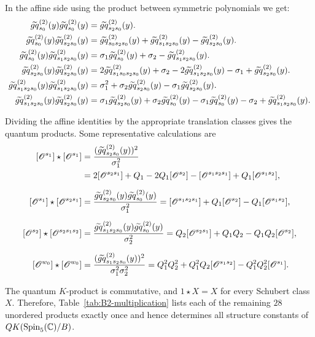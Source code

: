 \documentclass[a4paper]{amsart}
\theoremstyle{remark}
\numberwithin{equation}{section}
\begin{document}
In the affine side using the product between symmetric polynomials we get:
\begin{align*}
\tgq{s_0}{2}(y)\tgq{s_0}{2}(y)&=\tgq{s_2s_0}{2}(y).\\
\tgq{s_0}{2}(y)\tgq{s_2s_0}{2}(y)&=\tgq{s_0s_2s_0}{2}(y)+\tgq{s_1s_2s_0}{2}(y)-\tgq{s_2s_0}{2}(y).\label{eq_P3}\\
\tgq{s_0}{2}(y)\tgq{s_1s_2s_0}{2}(y)&=\sigma_1\tgq{s_0}{2}(y) +\sigma_2- \tgq{s_1s_2s_0}{2}(y).\\
\tgq{s_2s_0}{2}(y)\tgq{s_2s_0}{2}(y)&=2\tgq{s_1s_0s_2s_0}{2}(y)+\sigma_2-2\tgq{s_1s_2s_0}{2}(y)-\sigma_1+\tgq{s_2s_0}{2}(y).\\
  \tgq{s_1s_2s_0}{2}(y)\tgq{s_1s_2s_0}{2}(y)
    &=\sigma_1^2+\sigma_2\tgq{s_2s_0}{2}(y)-\sigma_1\tgq{s_2s_0}{2}(y).\\
\tgq{s_1s_2s_0}{2}(y)\tgq{s_2s_0}{2}(y)
    &= \sigma_1 \tgq{s_2s_0}{2}(y)+\sigma_2\tgq{s_0}{2}(y)-\sigma_1 \tgq{s_0}{2}(y) - \sigma_2+\tgq{s_1s_2s_0}{2}(y).
\end{align*}






Dividing the affine identities by the appropriate translation classes gives the quantum products.  Some
representative calculations are
\begin{align*}
\cOO{s_1}\star \cOO{s_1}
 &=\frac{(\tgq{s_2s_0}{2}(y))^2}{\sigma_1^2}\\
 &=2\cOO{s_2s_1}+Q_1-2Q_1\cOO{s_2}-\cOO{s_1s_2s_1}+Q_1\cOO{s_1s_2},\\[2mm]
\cOO{s_1}\star \cOO{s_2s_1}
 &=\frac{\tgq{s_2s_0}{2}(y)\tgq{s_0}{2}(y)}{\sigma_1^2}
 =\cOO{s_1s_2s_1}+Q_1\cOO{s_2}-Q_1\cOO{s_1s_2},\\[2mm]
\cOO{s_2}\star \cOO{s_2s_1s_2}
 &=\frac{\tgq{s_1s_2s_0}{2}(y)\tgq{s_0}{2}(y)}{\sigma_2^2}
 =Q_2\cOO{s_2s_1}+Q_1Q_2-Q_1Q_2\cOO{s_2},\\[2mm]
\cOO{w_0}\star \cOO{w_0}
 &=\frac{(\tgq{s_1s_2s_0}{2}(y))^2}{\sigma_1^2\sigma_2^2}
 =Q_1^2Q_2^2+Q_1^2Q_2\cOO{s_1s_2}-Q_1^2Q_2^2\cOO{s_1}.
\end{align*}

The quantum $K$-product is commutative, and $1\star X=X$ for every Schubert
class $X$.  Therefore, Table~\ref{tab:B2-multiplication} lists each of the
remaining $28$ unordered products exactly once and hence determines all
structure constants of $QK(\Spin_5(\C)/B)$.
\end{document}
